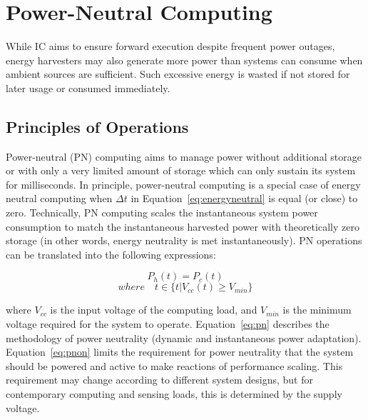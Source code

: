\section{Power-Neutral Computing} \label{Section:PN}

While IC aims to ensure forward execution despite frequent power outages, energy harvesters may also generate more power than systems can consume when ambient sources are sufficient. Such excessive energy is wasted if not stored for later usage or consumed immediately. 

\subsection{Principles of Operations}

Power-neutral (PN) computing aims to manage power without additional storage or with only a very limited amount of storage which can only sustain its system for milliseconds. In principle, power-neutral computing is a special case of energy neutral computing when $\Delta t$ in Equation~\ref{eq:energyneutral} is equal (or close) to zero. Technically, PN computing scales the instantaneous system power consumption to match the instantaneous harvested power with theoretically zero storage (in other words, energy neutrality is met instantaneously). PN operations can be translated into the following expressions:

\begin{equation} \label{eq:pn}
    P_h(t) = P_c(t)
\end{equation}
\begin{equation} \label{eq:pnon}
    where\quad t \in \{t|V_{cc}(t) \geq V_{min}\}
\end{equation}

where $V_{cc}$ is the input voltage of the computing load, and $V_{min}$ is the minimum voltage required for the system to operate. Equation~\ref{eq:pn} describes the methodology of power neutrality (dynamic and instantaneous power adaptation). Equation~\ref{eq:pnon} limits the requirement for power neutrality that the system should be powered and active to make reactions of performance scaling. This requirement may change according to different system designs, but for contemporary computing and sensing loads, this is determined by the supply voltage. 

